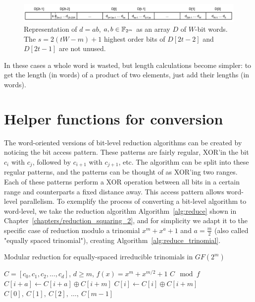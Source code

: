 \begin{figure}
  \centering
  \includegraphics[width = \columnwidth]{figures/two-word-element-2.pdf}
\caption{Representation of $d = ab$, $a,b \in {\mathbb F}_{2^m}$ as an array $D$ of $W$-bit words. The $s = 2(tW-m)+1$ highest order bits of $D[2t-2]$ and $D[2t-1]$ are not unused.}
\label{fig:elemento:field:mult2}
\end{figure}

In these cases a whole word is wasted, but length calculations become simpler: to get the length (in words) of a product of two elements, just add their lengths (in words). \\


\section{Helper functions for conversion} \label{helper-functions}

The word-oriented versions of bit-level reduction algorithms can be created by noticing the bit access pattern. These patterns are fairly regular, XOR'in the bit $c_i$ with $c_j$, followed by $c_{i+1}$ with $c_{j+1}$, etc. The algorithm can be split into these regular patterns, and the patterns can be thought of as XOR'ing two ranges. \\

Each of these patterns perform a XOR operation between all bits in a certain range and counterparts a fixed distance away. This access pattern allows word-level parallelism. To exemplify the process of converting a bit-level algorithm to word-level, we take the reduction algorithm Algorithm~\ref{alg:reduce} shown in Chapter~\ref{chapters/reduction_squaring_2}, and for simplicity we adapt it to the specific case of reduction modulo a trinomial $x^m + x^a + 1$ and $a=\frac{m}{2}$ (also called "equally spaced trinomial"), creating Algorithm~\ref{alg:reduce_trinomial}.

\begin{algorithm}
\caption{Modular reduction for equally-spaced irreducible trinomials in $GF(2^m)$}
\label{alg:reduce_trinomial}
\begin{algorithmic}[1]
\REQUIRE $C = [c_0, c_1, c_2, ..., c_d]$, $d \geq m$, $f(x) = x^m + x^{m/2} + 1$
\ENSURE $C \mod f$
    \STATE $C[i+a] \leftarrow C[i+a] \oplus C[i+m]$
  \ENDFOR
    \STATE $C[i] \leftarrow C[i] \oplus C[i+m]$
  \ENDFOR
\RETURN $C[0],~C[1],~C[2],~\ldots,~C[m-1]$
\end{algorithmic}
\end{algorithm}

